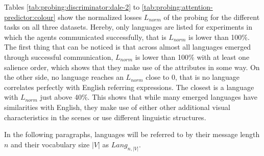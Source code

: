 Tables \ref{tab:probing:discriminator:dale-2} to \ref{tab:probing:attention-predictor:colour} show the normalized losses $L_{norm}$ of the probing for the different tasks on all three datasets.
Hereby, only languages are listed for experiments in which the agents communicated successfully, that is $L_{norm}$ is lower than 100\%.
The first thing that can be noticed is that across almost all languages emerged through successful communication, $L_{norm}$ is lower than 100\% with at least one salience order, which shows that they make use of the attributes in some way.
On the other side, no language reaches an $L_{norm}$ close to 0, that is no language correlates perfectly with English referring expressions.
The closest is a language with $L_{norm}$ just above 40\%.
This shows that while many emerged languages have similarities with English, they make use of either other additional visual characteristics in the scenes or use different linguistic structures.

In the following paragraphs, languages will be referred to by their message length $n$ and their vocabulary size $|V|$ as $Lang_{n,|V|}$.

